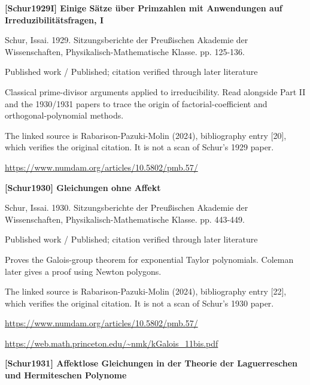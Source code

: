 \documentclass[11pt,a4paper,oneside,openany]{book}
\begin{document}
\vspace{9pt}
\hypertarget{ref:Schur1929I}{}
{\sffamily\bfseries\color{atlasgreen}[Schur1929I] Einige Sätze über Primzahlen mit Anwendungen auf Irreduzibilitätsfragen, I}\par
\color{black} Schur, Issai. 1929. Sitzungsberichte der Preußischen Akademie der Wissenschaften, Physikalisch-Mathematische Klasse. pp. 125-136.\par
{\small\sffamily\color{atlasgold}Published work / Published; citation verified through later literature}\par
\color{black} Classical prime-divisor arguments applied to irreducibility. Read alongside Part II and the 1930/1931 papers to trace the origin of factorial-coefficient and orthogonal-polynomial methods.\par
{\small The linked source is Rabarison-Pazuki-Molin (2024), bibliography entry [20], which verifies the original citation. It is not a scan of Schur's 1929 paper.}\par
{\footnotesize\url{https://www.numdam.org/articles/10.5802/pmb.57/}}\par
\vspace{9pt}
\hypertarget{ref:Schur1930}{}
{\sffamily\bfseries\color{atlasgreen}[Schur1930] Gleichungen ohne Affekt}\par
\color{black} Schur, Issai. 1930. Sitzungsberichte der Preußischen Akademie der Wissenschaften, Physikalisch-Mathematische Klasse. pp. 443-449.\par
{\small\sffamily\color{atlasgold}Published work / Published; citation verified through later literature}\par
\color{black} Proves the Galois-group theorem for exponential Taylor polynomials. Coleman later gives a proof using Newton polygons.\par
{\small The linked source is Rabarison-Pazuki-Molin (2024), bibliography entry [22], which verifies the original citation. It is not a scan of Schur's 1930 paper.}\par
{\footnotesize\url{https://www.numdam.org/articles/10.5802/pmb.57/}}\par
{\footnotesize\url{https://web.math.princeton.edu/~nmk/kGalois_11bis.pdf}}\par
\vspace{9pt}
\hypertarget{ref:Schur1931}{}
{\sffamily\bfseries\color{atlasgreen}[Schur1931] Affektlose Gleichungen in der Theorie der Laguerreschen und Hermiteschen Polynome}\par
\end{document}
